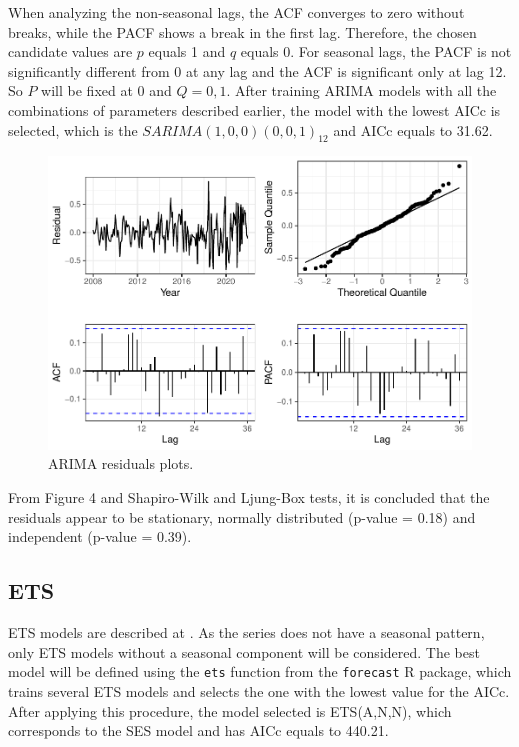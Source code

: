 \documentclass{statsoc}
\begin{document}
When analyzing the non-seasonal lags, the ACF converges to zero without
breaks, while the PACF shows a break in the first lag. Therefore, the
chosen candidate values are \(p\) equals 1 and \(q\) equals 0. For
seasonal lags, the PACF is not significantly different from 0 at any lag
and the ACF is significant only at lag 12. So \(P\) will be fixed at 0
and \(Q=0,1\). After training ARIMA models with all the combinations of
parameters described earlier, the model with the lowest AICc is
selected, which is the \(SARIMA(1,0,0)(0,0,1)_{12}\) and AICc equals to
31.62.

\begin{figure}

{\centering \includegraphics[height=0.4\textheight]{Trabalho_2_article_files/figure-latex/arima-residuals-plots-1} 

}

\caption{ARIMA residuals plots.}\label{fig:arima-residuals-plots}
\end{figure}

From Figure 4 and Shapiro-Wilk and Ljung-Box tests, it is concluded that
the residuals appear to be stationary, normally distributed (p-value =
0.18) and independent (p-value = 0.39).

\hypertarget{ets}{%
\subsection{ETS}\label{ets}}

ETS models are described at \citet{hyndman2008}. As the series does not
have a seasonal pattern, only ETS models without a seasonal component
will be considered. The best model will be defined using the
\texttt{ets} function from the \texttt{forecast} R package, which trains
several ETS models and selects the one with the lowest value for the
AICc. After applying this procedure, the model selected is ETS(A,N,N),
which corresponds to the SES model and has AICc equals to 440.21.
\end{document}
